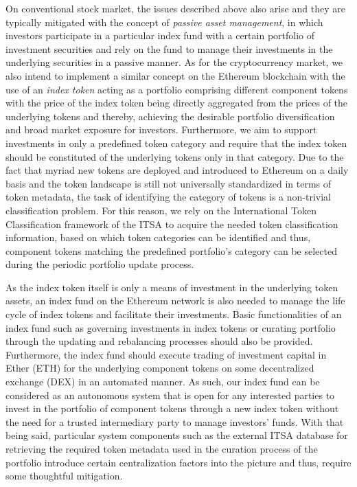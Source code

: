 On conventional stock market, the issues described above also arise and they are typically mitigated with the concept of \textit{passive asset management}, in which investors participate in a particular index fund with a certain portfolio of investment securities and rely on the fund to manage their investments in the underlying securities in a passive manner. As for the cryptocurrency market, we also intend to implement a similar concept on the Ethereum blockchain with the use of an \textit{index token} acting as a portfolio comprising different component tokens with the price of the index token being directly aggregated from the prices of the underlying tokens and thereby, achieving the desirable portfolio diversification and broad market exposure for investors. Furthermore, we aim to support investments in only a predefined token category and require that the index token should be constituted of the underlying tokens only in that category. Due to the fact that myriad new tokens are deployed and introduced to Ethereum on a daily basis and the token landscape is still not universally standardized in terms of token metadata, the task of identifying the category of tokens is a non-trivial classification problem. For this reason, we rely on the International Token Classification framework of the ITSA to acquire the needed token classification information, based on which token categories can be identified and thus, component tokens matching the predefined portfolio's category can be selected during the periodic portfolio update process.


As the index token itself is only a means of investment in the underlying token assets, an index fund on the Ethereum network is also needed to manage the life cycle of index tokens and facilitate their investments. Basic functionalities of an index fund such as governing investments in index tokens or curating portfolio through the updating and rebalancing processes should also be provided. Furthermore, the index fund should execute trading of investment capital in Ether (ETH) for the underlying component tokens on some decentralized exchange (DEX) in an automated manner. As such, our index fund can be considered as an autonomous system that is open for any interested parties to invest in the portfolio of component tokens through a new index token without the need for a trusted intermediary party to manage investors' funds. With that being said, particular system components such as the external ITSA database for retrieving the required token metadata used in the curation process of the portfolio introduce certain centralization factors into the picture and thus, require some thoughtful mitigation.

